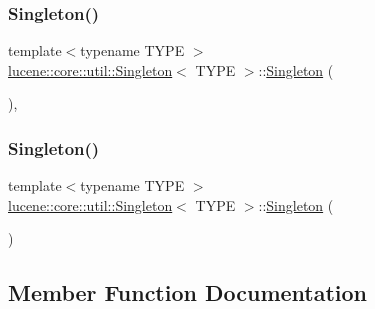 \subsubsection{\texorpdfstring{Singleton()}{Singleton()}\hspace{0.1cm}{\footnotesize\ttfamily [1/2]}}
{\footnotesize\ttfamily template$<$typename T\+Y\+PE $>$ \\
\mbox{\hyperlink{classlucene_1_1core_1_1util_1_1Singleton}{lucene\+::core\+::util\+::\+Singleton}}$<$ T\+Y\+PE $>$\+::\mbox{\hyperlink{classlucene_1_1core_1_1util_1_1Singleton}{Singleton}} (\begin{DoxyParamCaption}{ }\end{DoxyParamCaption})\hspace{0.3cm}{\ttfamily [inline]}, {\ttfamily [private]}}

\mbox{\label{classlucene_1_1core_1_1util_1_1Singleton_ab5733f8687076b2ce608b096f91f5237}} 
\subsubsection{\texorpdfstring{Singleton()}{Singleton()}\hspace{0.1cm}{\footnotesize\ttfamily [2/2]}}
{\footnotesize\ttfamily template$<$typename T\+Y\+PE $>$ \\
\mbox{\hyperlink{classlucene_1_1core_1_1util_1_1Singleton}{lucene\+::core\+::util\+::\+Singleton}}$<$ T\+Y\+PE $>$\+::\mbox{\hyperlink{classlucene_1_1core_1_1util_1_1Singleton}{Singleton}} (\begin{DoxyParamCaption}\item[{const \mbox{\hyperlink{classlucene_1_1core_1_1util_1_1Singleton}{Singleton}}$<$ T\+Y\+PE $>$ \&}]{ }\end{DoxyParamCaption})\hspace{0.3cm}{\ttfamily [delete]}}



\subsection{Member Function Documentation}
\mbox{\label{classlucene_1_1core_1_1util_1_1Singleton_a5e8079ebbaae97438a52c449ee92aafa}} 
